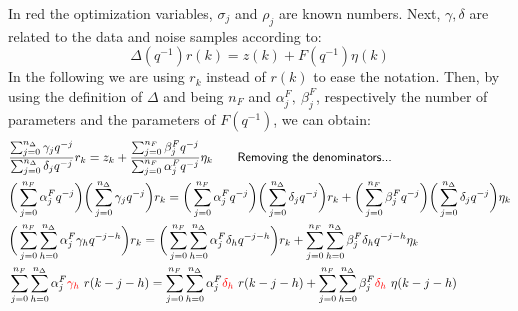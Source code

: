 \noindent
In {\color{red}red} the optimization variables, $\sigma_j$ and $\rho_j$ are known numbers. Next, $\gamma,\delta$ are related to the data and noise samples according to: $$\Delta(q^{-1}) r(k)=z(k) + F(q^{-1}) \eta(k)$$
In the following we are using  $r_k$ instead of $r(k)$ to ease the notation. Then, by using the definition of $\Delta$ and being $n_F$ and $\alpha_j^F, \ \beta_j^F$, respectively the number of parameters and the parameters of $F(q^{-1})$, we can obtain:
\begin{align}
    &\frac{
        \sum_{j=0}^{n_\Delta} \gamma_j q^{-j}
    }{
        \sum_{j=0}^{n_\Delta} \delta_j q^{-j}
    }r_k = z_k +  \frac{
        \sum_{j=0}^{n_F} \beta_j^F q^{-j}
    }{
        \sum_{j=0}^{n_F} \alpha_j^F q^{-j}
    } \eta_k \qquad \textsf{Removing the denominators...}\label{eq:first_1}\\
    &
    \bigg(\sum_{j=0}^{n_F} \alpha_j^F q^{-j}\bigg) 
    \bigg(\sum_{j=0}^{n_\Delta} \gamma_j q^{-j}\bigg) r_k=
    \bigg(\sum_{j=0}^{n_F} \alpha_j^F q^{-j}\bigg) 
    \bigg(\sum_{j=0}^{n_\Delta} \delta_j q^{-j}\bigg) r_k + 
    \bigg(\sum_{j=0}^{n_F} \beta_j^F q^{-j}\bigg) \bigg(\sum_{j=0}^{n_\Delta} \delta_j q^{-j}\bigg) \eta_k \label{eq:plain_eq} \\
    &\bigg(
        \sum_{j=0}^{n_F} \sum_{h=0}^{n_\Delta} {\alpha_j^F \gamma_h q^{-j-h}}
    \bigg) r_k =
    \bigg(
        \sum_{j=0}^{n_F} \sum_{h=0}^{n_\Delta}{\alpha_j^F \delta_h q^{-j-h}} 
        \bigg) 
    r_k+
        \sum_{j=0}^{n_F} \sum_{h=0}^{n_\Delta}{\beta_j^F \delta_h q^{-j-h}}
     \eta_k\label{eq:lastbutone}\\
     &
        \sum_{j=0}^{n_F} \sum_{h=0}^{n_\Delta} {\alpha_j^F {\color{red}\gamma_h} \ r({k-j-h})} =
        \sum_{j=0}^{n_F} \sum_{h=0}^{n_\Delta}{\alpha_j^F {\color{red}\delta_h} \ r({k-j-h})} +
        \sum_{j=0}^{n_F} \sum_{h=0}^{n_\Delta}{\beta_j^F {\color{red}\delta_h} \ \eta({k-j-h})}\label{eq:last_one}
\end{align}
